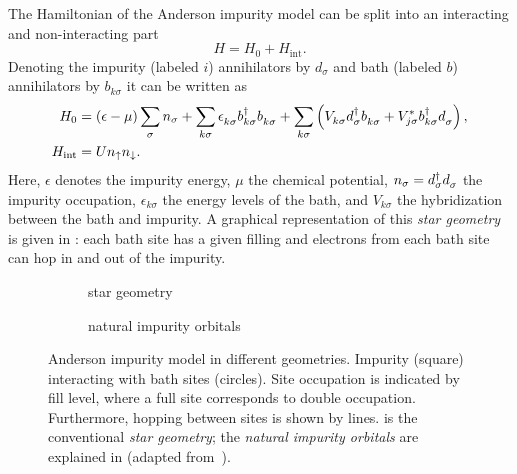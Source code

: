 The Hamiltonian of the Anderson impurity model \cite{Anderson1961} can be split into
an interacting and non-interacting part
\begin{equation}
    H = H_0 + H_\mathrm{int}.
    \label{eq:impurity-Hamiltonian}
\end{equation}
Denoting the impurity (labeled $i$) annihilators by $d_\sigma$
and bath (labeled $b$) annihilators by $b_{k\sigma}$
it can be written as
\begin{align}
    H_0
     & =
    (\epsilon - \mu) \sum_{\pk\sigma} n_\sigma
    +
    \sum_{k\sigma} \epsilon_{k\sigma}^{\pdag} b^\dag_{k\sigma} b^{\pdag}_{k\sigma}
    +
    \sum_{k\sigma} \left(V^{\ps}_{k\sigma} d^\dag_{\pk\sigma} b^{\pdag}_{k\sigma}
    + V_{j\sigma}^* b^\dag_{k\sigma} d^{\pdag}_{\pk\sigma} \right),
    \\
    H_\mathrm{int}
     & =
    U n_\uparrow n_\downarrow.
    \label{eq:anderson-interaction}
\end{align}
Here,
$\epsilon$ denotes the impurity energy,
$\mu$ the chemical potential,
$n_\sigma = d^\dag_\sigma d^{\pdag}_\sigma$ the impurity occupation,
$\epsilon_{k\sigma}$ the energy levels of the bath,
and $V_{k\sigma}$ the hybridization between the bath and impurity.
A graphical representation of this \emph{star geometry} is given in :
each bath site has a given filling
and electrons from each bath site can hop in and out of the impurity.

\begin{figure}[ht]
    \centering
    \savebox{\imagebox}{} %
    \begin{subfigure}{0.45\textwidth}
        \centering
        \usebox{\imagebox}
        \caption{star geometry}
        \label{subfig:geometry-star}
    \end{subfigure}
    \begin{subfigure}{0.45\textwidth}
        \centering
        \raisebox{\dimexpr0.5\ht\imagebox-0.5\height}
        {
            
        }
        \caption{natural impurity orbitals}
        \label{subfig:geometry-natural-impurity-orbitals}
    \end{subfigure}
    \caption{
        Anderson impurity model in different geometries.
        Impurity (square) interacting with bath sites (circles).
        Site occupation is indicated by fill level,
        where a full site corresponds to double occupation.
        Furthermore, hopping between sites is shown by lines.
         is the conventional \emph{star geometry};
         the \emph{natural impurity orbitals}
        are explained in 
        (adapted from~\cite{Lu2019}).
    }
\end{figure}

